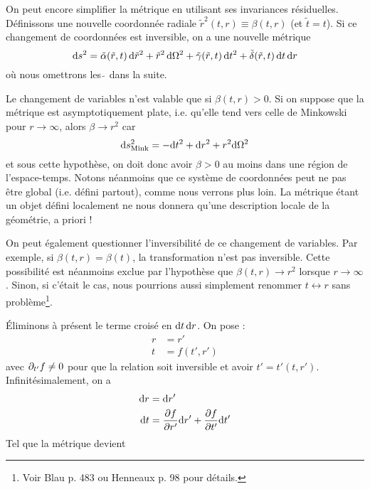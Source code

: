 On peut encore simplifier la métrique en utilisant ses invariances résiduelles. Définissons une nouvelle coordonnée radiale $\tilde{r}^2(t,r) \equiv \beta (t,r)$ (et $\tilde{t} = t$). Si ce changement de coordonnées est inversible, on a une nouvelle métrique 
\begin{equation}
    \mathrm{d} s^2 = \tilde{\alpha} (\tilde{r},t)\, \mathrm{d} \tilde{r}^2 + \tilde{r}^2\, \mathrm{d} \Omega^2 + \tilde{\gamma}(\tilde{r},t) \,\mathrm{d} t^2 + \tilde{\delta} (\tilde{r},t) \, \mathrm{d} t \,\mathrm{d} r
\end{equation}
où nous omettrons les  $\tilde \,$  dans la suite. 
\begin{rmk}
    Le changement de variables n'est valable que si $\beta (t,r)>0$. Si on suppose que la métrique est asymptotiquement plate, i.e. qu'elle tend vers celle de Minkowski pour $r \to \infty$, alors $\beta \to r^2$ car
    \begin{equation}
        \mathrm{d} s_\text{Mink}^2 = -\mathrm{d} t^2 +\mathrm{d} r ^2 + r^2 \mathrm{d} \Omega^2
    \end{equation}
    et sous cette hypothèse, on doit donc avoir $\beta > 0 $ au moins dans une région de l'espace-temps. Notons néanmoins que ce système de coordonnées peut ne pas être global (i.e. défini partout), comme nous verrons plus loin. La métrique étant un objet défini localement ne nous donnera qu'une description locale de la géométrie, a priori !
\end{rmk}
\begin{rmk}
    On peut également questionner l'inversibilité de ce changement de variables. Par exemple, si $\beta (t,r) = \beta (t)$, la transformation n'est pas inversible. Cette possibilité est néanmoins exclue par l'hypothèse que $\beta (t,r) \to r^2$ lorsque $r\to \infty$. Sinon, si c'était le cas, nous pourrions aussi simplement renommer $t \longleftrightarrow r$ sans problème\footnote{Voir Blau p. 483 ou Henneaux p. 98 pour détails.}.
\end{rmk}
Éliminons à présent le terme croisé en $\mathrm{d} t \, \mathrm{d} r$. On pose :
\begin{align*}
    r &= r'\\
    t &= f(t',r')
\end{align*}
avec $\partial_{t'}f \neq 0$ pour que la relation soit inversible et avoir $t' = t'(t,r')$. Infinitésimalement, on a
\begin{align*}
    \mathrm{d} r &= \mathrm{d} r' \\
    \mathrm{d} t &= \frac{\partial f}{\partial r'} \mathrm{d} r' + \frac{\partial f}{ \partial t'} \mathrm{d} t'
\end{align*}
Tel que la métrique devient 
